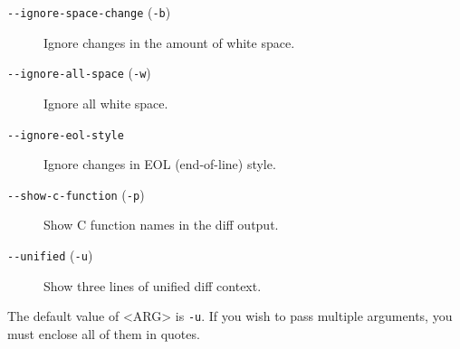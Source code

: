 \begin{description}
\begin{description}
\item[\texttt{-\/-ignore-space-change} (\texttt{-b})]
Ignore changes in the amount of white space.
\item[\texttt{-\/-ignore-all-space} (\texttt{-w})]
Ignore all white space.
\item[\texttt{-\/-ignore-eol-style}]
Ignore changes in EOL (end-of-line) style.
\item[\texttt{-\/-show-c-function} (\texttt{-p})]
Show C function names in the diff output.
\item[\texttt{-\/-unified} (\texttt{-u})]
Show three lines of unified diff context.
\end{description}

The default value of \textless ARG\textgreater{} is \texttt{-u}. If you
wish to pass multiple arguments, you must enclose all of them in quotes.


\end{description}
